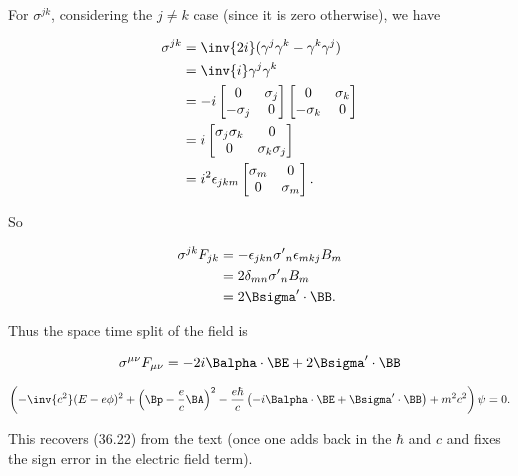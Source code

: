 For $\sigma^{j k}$, considering the $j \ne k$ case (since it is zero otherwise), we have

\begin{align*}
\sigma^{j k} 
&=
\inv{2i} (\gamma^j \gamma^k - \gamma^k \gamma^j) \\
&=
\inv{i} \gamma^j \gamma^k  \\
&=
- i 
\begin{bmatrix}
0 & \sigma_j \\
-\sigma_j & 0
\end{bmatrix}
\begin{bmatrix}
0 & \sigma_k \\
-\sigma_k & 0
\end{bmatrix}
\\
&=
i
\begin{bmatrix}
\sigma_j \sigma_k & 0 \\
0 & \sigma_k \sigma_j 
\end{bmatrix} \\
&=
i^2 \epsilon_{j k m}
\begin{bmatrix}
\sigma_m & 0 \\
0 & \sigma_m
\end{bmatrix}.
\end{align*} 

So

\begin{align*}
\sigma^{j k} F_{j k} 
&= 
- \epsilon_{j k n} {\sigma'}_n 
\epsilon_{m k j} B_m \\
&= 
2 \delta_{m n} {\sigma'}_n B_m \\
&= 
2 \Bsigma' \cdot \BB.
\end{align*}

Thus the space time split of the field is

\begin{equation}\label{eqn:diracCovariant:n}
\sigma^{\mu \nu} F_{\mu \nu}
=
-2 i \Balpha \cdot \BE + 2 \Bsigma' \cdot \BB
\end{equation}

\begin{equation}\label{eqn:diracCovariant:n}
\left( 
-\inv{c^2 } (E - e \phi)^2 + \left(\Bp - \frac{e }{c} \BA \right)^2
- \frac{ e \hbar }{ c } \left( -i \Balpha \cdot \BE + \Bsigma' \cdot \BB \right) + m^2 c^2 \right) \psi  = 0.
\end{equation}

This recovers (36.22) from the text (once one adds back in the $\hbar$ and $c$ and fixes the sign error in the electric field term).

\EndArticle

